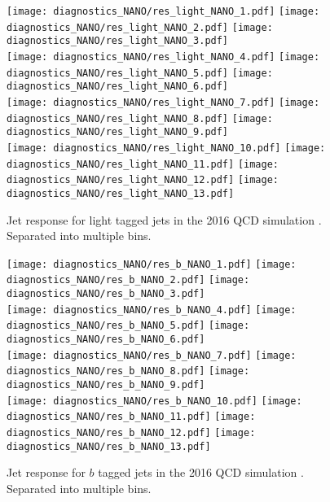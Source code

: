 \begin{figure}[!htb]
	\begin{center}
  \texttt{[image: diagnostics\_NANO/res\_light\_NANO\_1.pdf]}
  \texttt{[image: diagnostics\_NANO/res\_light\_NANO\_2.pdf]} 
  \texttt{[image: diagnostics\_NANO/res\_light\_NANO\_3.pdf]} \\
  \texttt{[image: diagnostics\_NANO/res\_light\_NANO\_4.pdf]}
  \texttt{[image: diagnostics\_NANO/res\_light\_NANO\_5.pdf]} 
  \texttt{[image: diagnostics\_NANO/res\_light\_NANO\_6.pdf]} \\
  \texttt{[image: diagnostics\_NANO/res\_light\_NANO\_7.pdf]}
  \texttt{[image: diagnostics\_NANO/res\_light\_NANO\_8.pdf]} 
  \texttt{[image: diagnostics\_NANO/res\_light\_NANO\_9.pdf]} \\
  \texttt{[image: diagnostics\_NANO/res\_light\_NANO\_10.pdf]}
  \texttt{[image: diagnostics\_NANO/res\_light\_NANO\_11.pdf]} 
  \texttt{[image: diagnostics\_NANO/res\_light\_NANO\_12.pdf]}     
  \texttt{[image: diagnostics\_NANO/res\_light\_NANO\_13.pdf]} \\      
	\end{center}
	\caption[Light Jet Response]{Jet response for light tagged jets in the 2016 QCD simulation . Separated into multiple \pt{} bins.
	 }
	\label{fig:qcd-light-jet-res}
\end{figure}
\begin{figure}[!htb]
	\begin{center}  
  \texttt{[image: diagnostics\_NANO/res\_b\_NANO\_1.pdf]}
  \texttt{[image: diagnostics\_NANO/res\_b\_NANO\_2.pdf]} 
  \texttt{[image: diagnostics\_NANO/res\_b\_NANO\_3.pdf]} \\
  \texttt{[image: diagnostics\_NANO/res\_b\_NANO\_4.pdf]}
  \texttt{[image: diagnostics\_NANO/res\_b\_NANO\_5.pdf]} 
  \texttt{[image: diagnostics\_NANO/res\_b\_NANO\_6.pdf]} \\
  \texttt{[image: diagnostics\_NANO/res\_b\_NANO\_7.pdf]}
  \texttt{[image: diagnostics\_NANO/res\_b\_NANO\_8.pdf]} 
  \texttt{[image: diagnostics\_NANO/res\_b\_NANO\_9.pdf]} \\
  \texttt{[image: diagnostics\_NANO/res\_b\_NANO\_10.pdf]}
  \texttt{[image: diagnostics\_NANO/res\_b\_NANO\_11.pdf]} 
  \texttt{[image: diagnostics\_NANO/res\_b\_NANO\_12.pdf]}     
  \texttt{[image: diagnostics\_NANO/res\_b\_NANO\_13.pdf]} \\ 
	\end{center}
	\caption[B Jet Response]{Jet response for $b$ tagged jets in the 2016 QCD simulation . Separated into multiple \pt{} bins.
	 }
	\label{fig:qcd-b-jet-res}
\end{figure}
